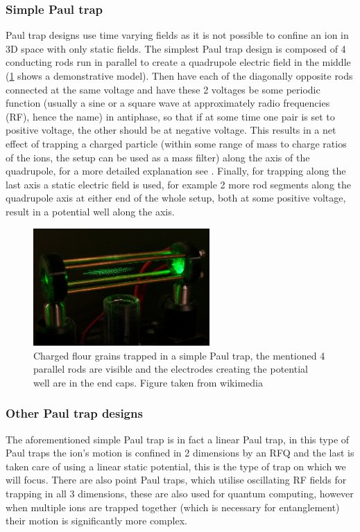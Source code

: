 \subsubsection{Simple Paul trap}
Paul trap designs use time varying fields as it is not possible to confine an ion in 3D space with only static fields.
The simplest Paul trap design is composed of 4 conducting rods run in parallel to create a quadrupole electric field in the middle (\cref{fig:TIQC_RFQ_Flour} shows a demonstrative model).
Then have each of the diagonally opposite rods connected at the same voltage and have these 2 voltages be some periodic function (usually a sine or a square wave at approximately radio frequencies (RF), hence the name) in antiphase, so that if at some time one pair is set to positive voltage, the other should be at negative voltage.
This results in a net effect of trapping a charged particle (within some range of mass to charge ratios of the ions, the setup can be used as a mass filter) along the axis of the quadrupole, for a more detailed explanation see \cite{paulElectromagneticTrapsCharged1990}.
Finally, for trapping along the last axis a static electric field is used, for example 2 more rod segments along the quadrupole axis at either end of the whole setup, both at some positive voltage, result in a potential well along the axis.

\begin{figure}[H]
    \centering
    \includegraphics[width=0.6\textwidth]{images/TIQC_RFQ_Flour.jpg}
    \caption{Charged flour grains trapped in a simple Paul trap, the mentioned 4 parallel rods are visible and the electrodes creating the potential well are in the end caps.
    Figure taken from wikimedia \cite{pavelkaPaulTrap}}\label{fig:TIQC_RFQ_Flour}
\end{figure}

\subsubsection{Other Paul trap designs} \label{sec:other_paultraps}
The aforementioned simple Paul trap is in fact a linear Paul trap, in this type of Paul traps the ion's motion is confined in 2 dimensions by an RFQ and the last is taken care of using a linear static potential, this is the type of trap on which we will focus.
There are also point Paul traps, which utilise oscillating RF fields for trapping in all 3 dimensions, these are also used for quantum computing, however when multiple ions are trapped together (which is necessary for entanglement) their motion is significantly more complex.

